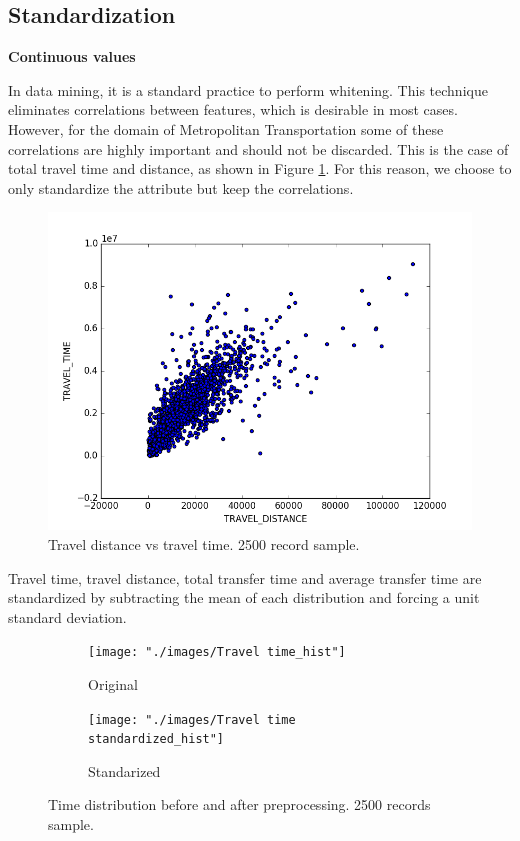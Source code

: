 \documentclass{article}
\begin{document}
\subsection{Standardization} 

\textbf{Continuous values}

In data mining, it is a standard practice to perform whitening. This technique eliminates correlations between features, which is desirable in most cases. However, for the domain of Metropolitan Transportation some of these correlations are highly important and should not be discarded. This is the case of total travel time and distance, as shown in Figure \ref{fig:preprocessing/distance_time_correlation}. For this reason, we choose to only standardize the attribute but keep the correlations. 

\begin{figure}[H]
  \centering
  \includegraphics[width=.6\linewidth]{./images/distance_vs_time.png}
  \caption{Travel distance vs travel time. 2500 record sample.}
  \label{fig:preprocessing/distance_time_correlation}
\end{figure}

Travel time, travel distance, total transfer time and average transfer time are standardized by subtracting the mean of each distribution and forcing a unit standard deviation.

\begin{figure}[H]
  \centering
  \begin{subfigure}[b]{.45\textwidth}
  	\centering
  	\texttt{[image: "./images/Travel time\_hist"]}
  	\caption{Original}
  \end{subfigure}
  \begin{subfigure}[b]{.45\textwidth}
  	\centering
  	\texttt{[image: "./images/Travel time standardized\_hist"]}
  	\caption{Standarized}
  \end{subfigure}
  \caption{Time distribution before and after preprocessing. 2500 records sample.}
  	\label{fig:preprocessing/time}
\end{figure}
\end{document}
